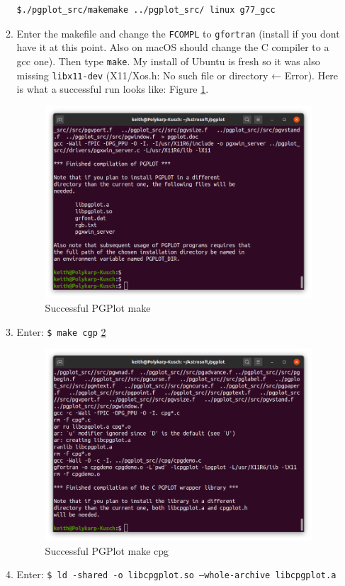 \documentclass{article}
\begin{document}
\begin{enumerate}
\begin{enumerate}
\begin{lstlisting}[language=bash]
$./pgplot_src/makemake ../pgplot_src/ linux g77_gcc
    			\end{lstlisting}
    			\item Enter the makefile and change the \texttt{FCOMPL} to \texttt{gfortran} (install if you dont have it at this point. Also on macOS should change the C compiler to a gcc one). Then type \texttt{make}. My install of Ubuntu is fresh so it was also missing \texttt{libx11-dev} (X11/Xos.h: No such file or directory ← Error). Here is what a successful run looks like: Figure \ref{fig:pgplot-make}.     			
    			\begin{figure}[h]
    				\includegraphics[width=\linewidth]{Images/sucesfful-pgplot-make.png}
    				\caption{Successful PGPlot make}
    				\label{fig:pgplot-make}  			
    			\end{figure}
    			\item Enter: \texttt{\$ make cgp} \ref{fig:pgplot-make-cpg}
    			\begin{figure}[h]
    				\includegraphics[width=\linewidth]{Images/sucesfful-pgplot-make-cgp.png}
    				\caption{Successful PGPlot make cpg}
    				\label{fig:pgplot-make-cpg}  			
    			\end{figure}
    			\item Enter: \texttt{\$ ld -shared -o libcpgplot.so --whole-archive libcpgplot.a}
    			

\end{enumerate}
\end{enumerate}
\end{document}
